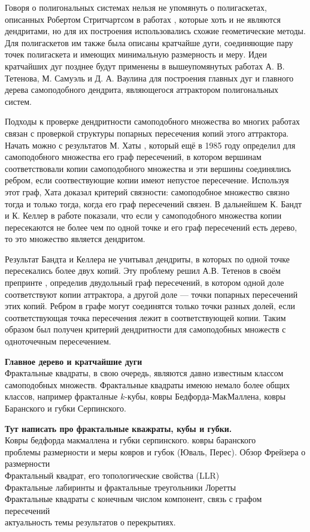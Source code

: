 Говоря о полигональных системах нельзя не упомянуть о полигаскетах, описанных Робертом Стритчартсом в работах \cite{strich1999, Strichartz1999}, которые хоть и не являются дендритами, но для их построения использовались схожие геометические методы.
Для полигаскетов им также была описаны кратчайше дуги, соединяющие пару точек полигаскета и имеющих минимальную размерность и меру.
Идеи кратчайших дуг позднее будут применены в вышеупомянутых работах \cite{TSV2017, STV2017} А. В. Тетенова, М. Самуэль и Д. А. Ваулина для построения главных дуг и главного дерева самоподобного дендрита, являющегося аттрактором полигональных систем.

Подходы к проверке дендритности самоподобного множества во многих работах связан с проверкой структуры попарных пересечения копий этого аттрактора.
Начать можно с результатов М. Хаты \cite{Hata1985}, который ещё в 1985 году определил для самоподобного множества его граф пересечений, в котором вершинам соответствовали копии самоподобного множества и эти вершины соединялись ребром, если соотвествующие копии имеют непустое пересечение.
Используя этот граф, Хата доказал критерий связности: самоподобное множество связно тогда и только тогда, когда его граф пересечений связен.
В дальнейшем К. Бандт и К. Келлер в работе \cite{SSS2} показали, что если у самоподобного множества копии пересекаются не более чем по одной точке и его граф пересечений есть дерево, то это множество является дендритом.

Результат Бандта и Келлера не учитывал дендриты, в которых по одной точке пересекались более двух копий. 
Эту проблему решил А.В. Тетенов в своём препринте \cite{FIP}, определив двудольный граф пересечений, в котором одной доле соответствуют копии аттрактора, а другой доле --- точки попарных пересечений этих копий. Ребром в графе могут соединятся только точки разных долей, если соответствующая точка пересечения лежит в соответствующей копии.
Таким образом был получен критерий дендритности для самоподобных множеств с одноточечным пересечением.

{\bf Главное дерево и кратчайшие дуги}\\

Фрактальные квадраты, в свою очередь, являются давно известным классом самоподобных множеств.
Фрактальные квадраты имеюю немало более общих классов, например фракталные $k$-кубы, ковры Бедфорда-МакМаллена, ковры Баранского и губки Серпинского.

{\bf Тут написать про фрактальные кважраты, кубы и губки.}\\
Ковры бедфорда макмаллена и губки серпинского. ковры баранского\\
проблемы размерности и меры ковров и губок (Юваль, Перес). Обзор Фрейзера о размерности\\
Фрактальный квадрат, его топологические свойства (LLR)\\
Фрактальные лабиринты и фрактальные треугольники Лоретты\\
Фрактальные квадраты с конечным числом компонент, связь с графом пересечений\\
актуальность темы результатов о перекрытиях.\\

